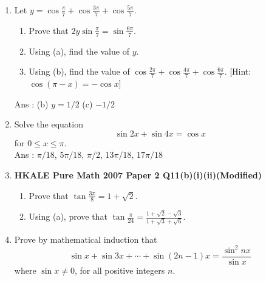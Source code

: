 \documentclass[12pt]{article}
\begin{document}
\begin{enumerate}
	\item Let $y = \displaystyle\cos{\frac{\pi}{7}} + \cos{\frac{3\pi}{7}} + \cos{\frac{5\pi}{7}}$.
	\begin{enumerate}
		\item Prove that $\displaystyle 2y\sin{\frac{\pi}{7}} = \sin{\frac{6\pi}{7}}$.
		\item Using (a), find the value of $y$.
		\item Using (b), find the value of $\displaystyle\cos{\frac{2\pi}{7}} + \cos{\frac{4\pi}{7}} + \cos{\frac{6\pi}{7}}$. [Hint: $\cos{(\pi - x)} = -\cos{x}$]
	\end{enumerate}
	Ans : (b) $y = 1/2$ (c) $-1/2$\newpage
	\item Solve the equation $$\sin{2x} + \sin{4x} = \cos{x}$$ for $0 \leq x \leq \pi$. \\Ans : $\pi/18$, $5\pi/18$, $\pi/2$, $13\pi/18$, $17\pi/18$\newpage
	\item 
	\textbf{HKALE Pure Math 2007 Paper 2 Q11(b)(i)(ii)(Modified)}
	\begin{enumerate}
		\item Prove that $\displaystyle\tan{\frac{3\pi}{8}} = 1 + \sqrt{2}$. 
		\item Using (a), prove that $\displaystyle \tan{\frac{\pi}{24}} = \frac{1 + \sqrt{2} - \sqrt{3}}{1 + \sqrt{3} + \sqrt{6}}$. 
	\end{enumerate}
	\newpage
	\item Prove by mathematical induction that $$\sin{x} + \sin{3x} + \cdots + \sin{(2n-1)x} = \displaystyle\frac{\sin^2{nx}}{\sin{x}}$$ where $\sin{x} \neq 0$, for all positive integers $n$.\newpage
\end{enumerate}
\end{document}
